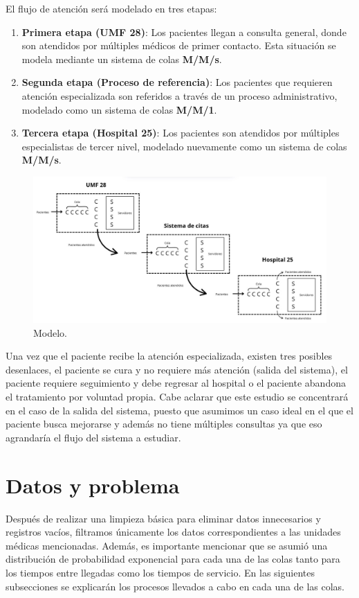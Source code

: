\documentclass[10pt]{article}
\begin{document}
    El flujo de atención será modelado en tres etapas:

    \begin{enumerate}
        \item \textbf{Primera etapa (UMF 28)}: Los pacientes llegan a consulta general, donde son atendidos por múltiples médicos de primer contacto. Esta situación se modela mediante un sistema de colas \textbf{M/M/s}.
        
        \item \textbf{Segunda etapa (Proceso de referencia)}: Los pacientes que requieren atención especializada son referidos a través de un proceso administrativo, modelado como un sistema de colas \textbf{M/M/1}.
        
        \item \textbf{Tercera etapa (Hospital 25)}: Los pacientes son atendidos por múltiples especialistas de tercer nivel, modelado nuevamente como un sistema de colas \textbf{M/M/s}.
    \end{enumerate}

    \begin{figure}[h]
		\centering
		\includegraphics[width=130mm]{./images/sistema.jpg}
		\caption{Modelo.}
	\end{figure}

    Una vez que el paciente recibe la atención especializada, existen tres posibles desenlaces, el paciente se cura y no requiere más atención (salida del sistema), el paciente requiere seguimiento y debe regresar al hospital o el paciente abandona el tratamiento por voluntad propia. Cabe aclarar que este estudio se concentrará en el caso de la salida del sistema, puesto que asumimos un caso ideal en el que el paciente busca mejorarse y además no tiene múltiples consultas ya que eso agrandaría el flujo del sistema a estudiar.

    \section{Datos y problema}
    Después de realizar una limpieza básica para eliminar datos innecesarios y registros vacíos, filtramos únicamente los datos correspondientes a las unidades médicas mencionadas. Además, es importante mencionar que se asumió una distribución de probabilidad exponencial para cada una de las colas tanto para los tiempos entre llegadas como los tiempos de servicio. En las siguientes subsecciones se explicarán los procesos llevados a cabo en cada una de las colas.
    
\end{document}
